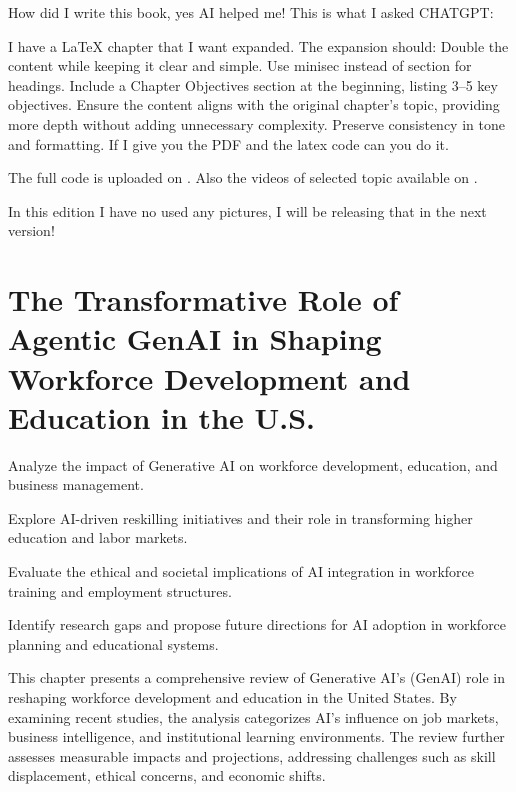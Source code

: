 \documentclass[a4paper,headinclude=on,footinclude=on,12pt,oneside]{scrbook}
\begin{document}

How did I write this book, yes AI helped me!
This is what I asked CHATGPT:

I have a LaTeX chapter that I want expanded. The expansion should:
Double the content while keeping it clear and simple.
Use minisec instead of section for headings.
Include a Chapter Objectives section at the beginning, listing 3–5 key objectives.
Ensure the content aligns with the original chapter's topic, providing more depth without adding unnecessary complexity.
Preserve consistency in tone and formatting.
If I give you the PDF and the latex code can you do it.


The full code is uploaded on \cite{JoshiGit2025}.
Also the videos of selected topic available on \cite{JoshiYouTube2025}.

In this edition I have no used any pictures, I will be releasing that in the  next version!  






\chapter{The Transformative Role of Agentic GenAI in Shaping Workforce Development and Education in the U.S.}

\begin{arrows}
	\item Analyze the impact of Generative AI on workforce development, education, and business management.
	\item Explore AI-driven reskilling initiatives and their role in transforming higher education and labor markets.
	\item Evaluate the ethical and societal implications of AI integration in workforce training and employment structures.
	\item Identify research gaps and propose future directions for AI adoption in workforce planning and educational systems.
	

	
	
	
\end{arrows}

This chapter presents a comprehensive review of Generative AI's (GenAI) role in reshaping workforce development and education in the United States. By examining recent studies, the analysis categorizes AI's influence on job markets, business intelligence, and institutional learning environments. The review further assesses measurable impacts and projections, addressing challenges such as skill displacement, ethical concerns, and economic shifts.
\end{document}
